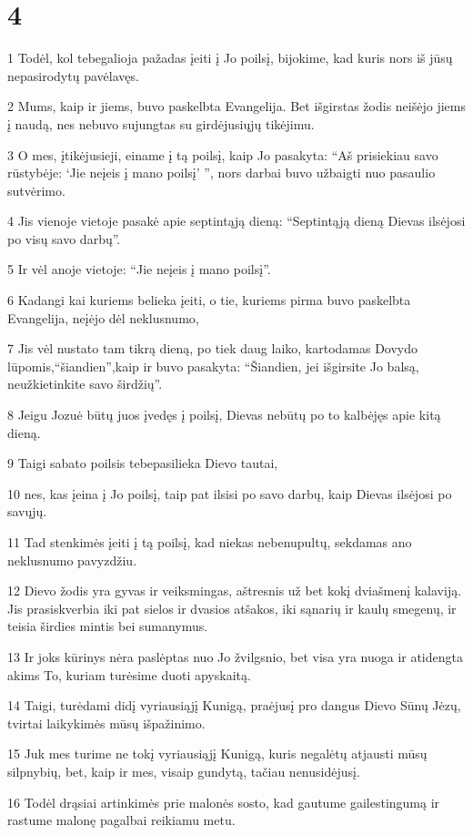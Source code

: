 \chapter{4}


\par 1 Todėl, kol tebegalioja pažadas įeiti į Jo poilsį, bijokime, kad kuris nors iš jūsų nepasirodytų pavėlavęs. 
\par 2 Mums, kaip ir jiems, buvo paskelbta Evangelija. Bet išgirstas žodis neišėjo jiems į naudą, nes nebuvo sujungtas su girdėjusiųjų tikėjimu. 
\par 3 O mes, įtikėjusieji, einame į tą poilsį, kaip Jo pasakyta: “Aš prisiekiau savo rūstybėje: ‘Jie neįeis į mano poilsį’ ”, nors darbai buvo užbaigti nuo pasaulio sutvėrimo. 
\par 4 Jis vienoje vietoje pasakė apie septintąją dieną: “Septintąją dieną Dievas ilsėjosi po visų savo darbų”. 
\par 5 Ir vėl anoje vietoje: “Jie neįeis į mano poilsį”. 
\par 6 Kadangi kai kuriems belieka įeiti, o tie, kuriems pirma buvo paskelbta Evangelija, neįėjo dėl neklusnumo, 
\par 7 Jis vėl nustato tam tikrą dieną, po tiek daug laiko, kartodamas Dovydo lūpomis,­“šiandien”,­kaip ir buvo pasakyta: “Šiandien, jei išgirsite Jo balsą, neužkietinkite savo širdžių”. 
\par 8 Jeigu Jozuė būtų juos įvedęs į poilsį, Dievas nebūtų po to kalbėjęs apie kitą dieną. 
\par 9 Taigi sabato poilsis tebepasilieka Dievo tautai, 
\par 10 nes, kas įeina į Jo poilsį, taip pat ilsisi po savo darbų, kaip Dievas ilsėjosi po savųjų. 
\par 11 Tad stenkimės įeiti į tą poilsį, kad niekas nebenupultų, sekdamas ano neklusnumo pavyzdžiu. 
\par 12 Dievo žodis yra gyvas ir veiksmingas, aštresnis už bet kokį dviašmenį kalaviją. Jis prasiskverbia iki pat sielos ir dvasios atšakos, iki sąnarių ir kaulų smegenų, ir teisia širdies mintis bei sumanymus. 
\par 13 Ir joks kūrinys nėra paslėptas nuo Jo žvilgsnio, bet visa yra nuoga ir atidengta akims To, kuriam turėsime duoti apyskaitą. 
\par 14 Taigi, turėdami didį vyriausiąjį Kunigą, praėjusį pro dangus Dievo Sūnų Jėzų, tvirtai laikykimės mūsų išpažinimo. 
\par 15 Juk mes turime ne tokį vyriausiąjį Kunigą, kuris negalėtų atjausti mūsų silpnybių, bet, kaip ir mes, visaip gundytą, tačiau nenusidėjusį. 
\par 16 Todėl drąsiai artinkimės prie malonės sosto, kad gautume gailestingumą ir rastume malonę pagalbai reikiamu metu.


